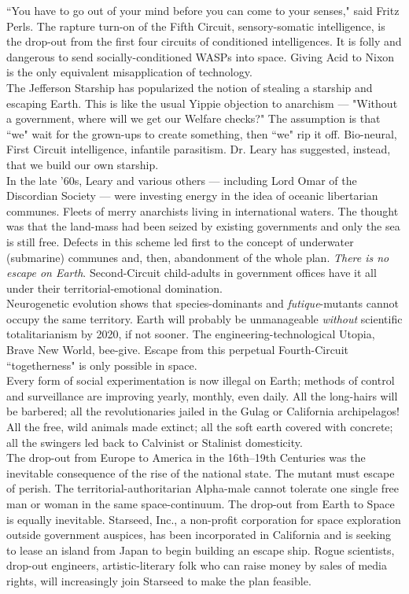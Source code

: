 \documentclass[12pt, onecolumn, letterpaper, oneside]{book}
\begin{document}
``You have to go out of your mind before you can come to your senses," said Fritz Perls. The rapture turn-on of the Fifth Circuit, sensory-somatic intelligence, is the drop-out from the first four circuits of conditioned intelligences. It is folly and dangerous to send socially-conditioned WASPs into space. Giving Acid to Nixon is the only equivalent misapplication of technology.\\
The Jefferson Starship has popularized the notion of stealing a starship and escaping Earth. This is like the usual Yippie objection to anarchism --- "Without a government, where will we get our Welfare checks?" The assumption is that ``we" wait for the grown-ups to create something, then ``we" rip it off. Bio-neural, First Circuit intelligence, infantile parasitism. Dr. Leary has suggested, instead, that we build our own starship.\\
In the late '60s, Leary and various others --- including Lord Omar of the Discordian Society --- were investing energy in the idea of oceanic libertarian communes. Fleets of merry anarchists living in international waters. The thought was that the land-mass had been seized by existing governments and only the sea is still free. Defects in this scheme led first to the concept of underwater (submarine) communes and, then, abandonment of the whole plan. \emph{There is no escape on Earth}. Second-Circuit child-adults in government offices have it all under their territorial-emotional domination.\\
Neurogenetic evolution shows that species-dominants and \emph{futique}-mutants cannot occupy the same territory. Earth will probably be unmanageable \emph{without} scientific totalitarianism by 2020, if not sooner. The engineering-technological Utopia, Brave New World, bee-give. Escape from this perpetual Fourth-Circuit ``togetherness" is only possible in space.\\
Every form of social experimentation is now illegal on Earth; methods of control and surveillance are improving yearly, monthly, even daily. All the long-hairs will be barbered; all the revolutionaries jailed in the Gulag or California archipelagos! All the free, wild animals made extinct; all the soft earth covered with concrete; all the swingers led back to Calvinist or Stalinist domesticity.\\
The drop-out from Europe to America in the 16th--19th Centuries was the inevitable consequence of the rise of the national state. The mutant must escape of perish. The territorial-authoritarian Alpha-male cannot tolerate one single free man or woman in the same space-continuum. The drop-out from Earth to Space is equally inevitable. Starseed, Inc., a non-profit corporation for space exploration outside government auspices, has been incorporated in California and is seeking to lease an island from Japan to begin building an escape ship. Rogue scientists, drop-out engineers, artistic-literary folk who can raise money by sales of media rights, will increasingly join Starseed to make the plan feasible.\\
\end{document}
